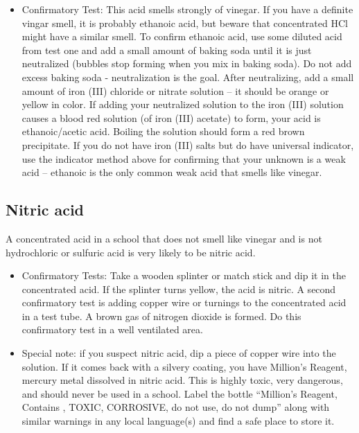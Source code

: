 \begin{itemize}

\item{Confirmatory Test: This acid smells strongly of vinegar. 
If you have a definite vingar smell, 
it is probably ethanoic acid, 
but beware that concentrated HCl might have a similar smell. 
To confirm ethanoic acid, 
use some diluted acid from test one 
and add a small amount of baking soda until it is just neutralized 
(bubbles stop forming when you mix in baking soda). 
Do not add excess baking soda - neutralization is the goal. 
After neutralizing, 
add a small amount of iron (III) chloride or nitrate solution -- 
it should be orange or yellow in color. 
If adding your neutralized solution to the iron (III) solution causes 
a blood red solution (of iron (III) acetate) to form, 
your acid is ethanoic/acetic acid. 
Boiling the solution should form a red brown precipitate. 
If you do not have iron (III) salts but do have universal indicator, 
use the indicator method above 
for confirming that your unknown is a weak acid -- 
ethanoic is the only common weak acid that smells like vinegar.} 
\end{itemize}

\subsection{Nitric acid}
A concentrated acid in a school that does not smell like vinegar 
and is not hydrochloric or sulfuric acid is very likely to be nitric acid. 

\begin{itemize}

\item{Confirmatory Tests: Take a wooden splinter 
or match stick and dip it in the concentrated acid. 
If the splinter turns yellow, 
the acid is nitric. 
A second confirmatory test is adding copper wire 
or turnings to the concentrated acid in a test tube. 
A brown gas of nitrogen dioxide is formed. 
Do this confirmatory test in a well ventilated area.}

\item{Special note: if you suspect nitric acid, 
dip a piece of copper wire into the solution. 
If it comes back with a silvery coating, 
you have Million’s Reagent, 
mercury metal dissolved in nitric acid. 
This is highly toxic, 
very dangerous, 
and should never be used in a school. 
Label the bottle “Million’s Reagent, 
Contains , 
TOXIC, 
CORROSIVE, 
do not use, 
do not dump” along with similar warnings 
in any local language(s) and find a safe place to store it.}

\end{itemize}

